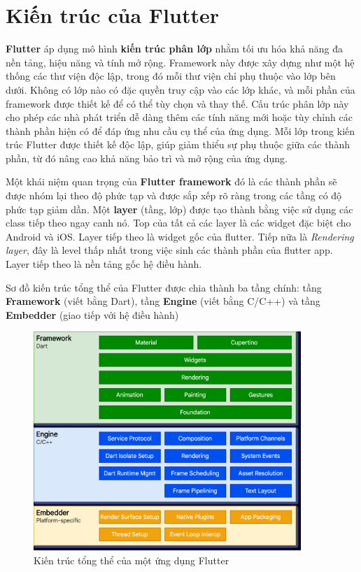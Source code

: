 \documentclass[../DoAn.tex]{subfiles}
\numberwithin{figure}{chapter}
\begin{document}
\section{Kiến trúc của Flutter}
\textbf{Flutter} áp dụng mô hình \textbf{kiến trúc phân lớp} nhằm tối ưu hóa khả năng đa nền tảng, hiệu năng và tính mở rộng. Framework này được xây dựng như một hệ thống các thư viện độc lập, trong đó mỗi thư viện chỉ phụ thuộc vào lớp bên dưới. Không có lớp nào có đặc quyền truy cập vào các lớp khác, và mỗi phần của framework được thiết kế để có thể tùy chọn và thay thế. Cấu trúc phân lớp này cho phép các nhà phát triển dễ dàng thêm các tính năng mới hoặc tùy chỉnh các thành phần hiện có để đáp ứng nhu cầu cụ thể của ứng dụng. Mỗi lớp trong kiến trúc Flutter được thiết kế độc lập, giúp giảm thiểu sự phụ thuộc giữa các thành phần, từ đó nâng cao khả năng bảo trì và mở rộng của ứng dụng.

Một khái niệm quan trọng của \textbf{Flutter framework} đó là các thành phần sẽ được nhóm lại theo độ phức tạp và được sắp xếp rõ ràng trong các tầng có độ phức tạp giảm dần. Một \textbf{layer} (tầng, lớp) được tạo thành bằng việc sử dụng các class tiếp theo ngay canh nó. Top của tất cả các layer là các widget đặc biệt cho Android và iOS. Layer tiếp theo là widget gốc của flutter. Tiếp nữa là \textit{Rendering layer}, đây là level thấp nhất trong việc sinh các thành phần của flutter app. Layer tiếp theo là nền tảng gốc hệ điều hành.

Sơ đồ kiến trúc tổng thể của Flutter được chia thành ba tầng chính: tầng \textbf{Framework} (viết bằng Dart), tầng \textbf{Engine} (viết bằng C/C++) và tầng \textbf{Embedder} (giao tiếp với hệ điều hành)

\begin{figure}[H]
    \centering
    \includegraphics[width=0.9\textwidth]{Hinhve/Chuong5/flutterArchitecture.png}
    \caption{Kiến trúc tổng thể của một ứng dụng Flutter}
    \label{fig:flutterarchitecture}
\end{figure}
\end{document}
